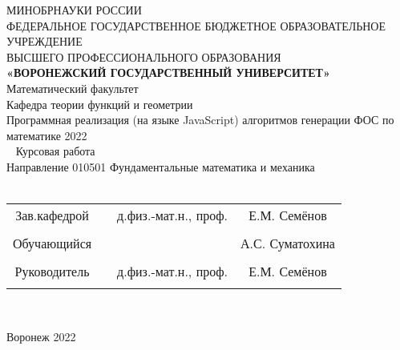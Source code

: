 
\begin{center}
    \hfill \break
    \large{МИНОБРНАУКИ РОССИИ}\\
    \footnotesize{ФЕДЕРАЛЬНОЕ ГОСУДАРСТВЕННОЕ БЮДЖЕТНОЕ ОБРАЗОВАТЕЛЬНОЕ УЧРЕЖДЕНИЕ}\\ 
    \footnotesize{ВЫСШЕГО ПРОФЕССИОНАЛЬНОГО ОБРАЗОВАНИЯ}\\
    \small{\textbf{«ВОРОНЕЖСКИЙ ГОСУДАРСТВЕННЫЙ УНИВЕРСИТЕТ»}}\\
    \hfill \break
    \normalsize{Математический факультет}\\
     \hfill \break
    \normalsize{Кафедра теории функций и геометрии}\\
    \hfill\break
    \hfill \break
    \hfill \break
    \hfill \break
    \large{Программная реализация (на языке JavaScript) алгоритмов генерации ФОС по математике 2022}\\
    \hfill \break
    \hfill \break
    \hfill \break\
    \hfill \break
    \hfill \break
    \normalsize{Курсовая работа\\
    \hfill \break
    Направление  010501 Фундаментальные математика и механика\\

    \hfill \break
    }\\
    \hfill \break
    \hfill \break
    \end{center}
    \hfill \break
     
    \normalsize{ 
    \begin{tabular}{cccc}
    Зав.кафедрой & \underline{\hspace{3cm}} &  д.физ.-мат.н.,  проф. & Е.М. Семёнов \\\\
    Обучающийся & \underline{\hspace{3cm}} & &А.С. Суматохина \\\\
    Руководитель & \underline{\hspace{3cm}}&  д.физ.-мат.н.,  проф. & Е.М. Семёнов \\\\
    \end{tabular}
    }\\
    \hfill \break
    \hfill \break
    \begin{center} Воронеж 2022 \end{center}
    \thispagestyle{empty} %
     
     